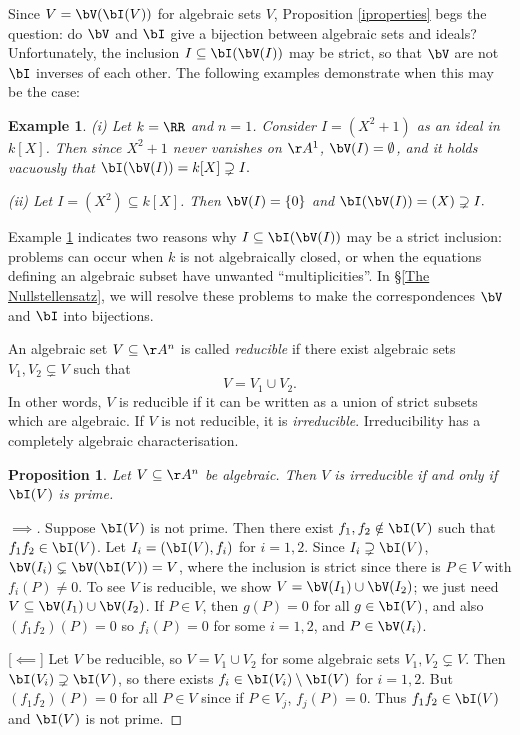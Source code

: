 \documentclass[12pt]{amsart}
\theoremstyle{plain}
\newtheorem{proposition}[theorem]{Proposition}
\newtheorem{example}[theorem]{Example}
\begin{document}
Since $V = \bV(\bI(V))$ for algebraic sets $V$, Proposition \ref{iproperties} begs the question: do $\bV$ and $\bI$ give a bijection between algebraic sets and ideals?
Unfortunately, the inclusion $I \subseteq \bI(\bV(I))$ may be strict, so that $\bV$ are not $\bI$ inverses of each other.
The following examples demonstrate when this may be the case:

\begin{example}\label{inclfails}
(i)
Let $k =\RR$ and $n=1$.
Consider $I = (X^2+1)$ as an ideal in $k[X]$.
Then since $X^2+1$ never vanishes on $\AA^1$, $\bV(I) = \emptyset$, and it holds vacuously that $\bI(\bV(I)) = k[X] \supsetneq I.$

(ii) Let $I = (X^2) \subseteq k[X]$.
Then $\bV(I) = \{0\}$ and $\bI(\bV(I)) = (X) \supsetneq I.$
\end{example}

Example \ref{inclfails} indicates two reasons why $I \subseteq \bI(\bV(I))$ may be a strict inclusion:
problems can occur when $k$ is not algebraically closed, or when the equations defining an algebraic subset have unwanted ``multiplicities''.
In \S \ref{The Nullstellensatz}, we will resolve these problems to make the correspondences $\bV$ and $\bI$ into bijections.

An algebraic set $V \subseteq \AA^n$ is called \emph{reducible} if there exist algebraic sets $V_1, V_2 \subsetneq V$ such that
$$V = V_1 \cup V_2.$$
In other words, $V$ is reducible if it can be written as a union of strict subsets which are algebraic.
If $V$ is not reducible, it is \emph{irreducible}.
Irreducibility has a completely algebraic characterisation.

\begin{proposition}\label{irreducibilityproposition}
Let $V \subseteq \AA^n$ be algebraic.
Then $V$ is irreducible if and only if $\bI(V)$ is prime.
\end{proposition}
\begin{proof}
[$\implies$] Suppose $\bI(V)$ is not prime.
Then there exist $f_1, f_2 \notin \bI(V)$ such that $f_1 f_2 \in \bI(V)$.
Let $I_i = (\bI(V), f_i)$ for $i=1, 2$.
Since $I_i \supsetneq \bI(V)$, $\bV(I_i) \subsetneq \bV(\bI(V)) = V$, where the inclusion is strict since there is $P \in V$ with $f_i(P) \ne 0$.
To see $V$ is reducible, we show $V = \bV(I_1) \cup \bV(I_2)$; we just need $V \subseteq \bV(I_1) \cup \bV(I_2)$.
If $P \in V$, then $g(P) = 0$ for all $g \in \bI(V)$, and also $(f_1 f_2)(P) = 0$ so $f_i(P) = 0$ for some $i=1,2$, and $P \in \bV(I_i)$.

[$\impliedby$] 
Let $V$ be reducible, so $V = V_1 \cup V_2$ for some algebraic sets $V_1, V_2 \subsetneq V$.
Then $\bI(V_i) \supsetneq \bI(V)$, so there exists $f_i \in \bI(V_i) \setminus \bI(V)$ for $i=1, 2$.
But $(f_1 f_2)(P) = 0$ for all $P \in V$ since if $P \in V_j$, $f_j(P) = 0$.
Thus $f_1 f_2 \in \bI(V)$ and $\bI(V)$ is not prime.
\end{proof}
\end{document}
